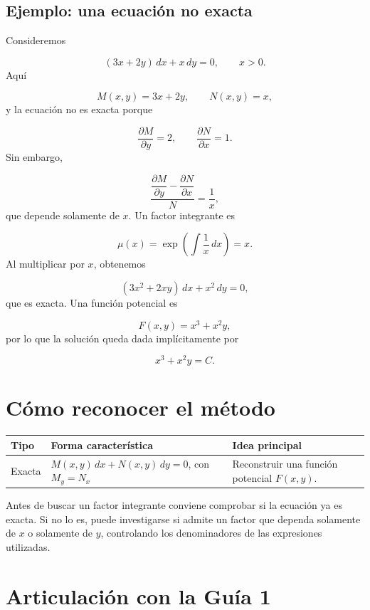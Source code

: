 \documentclass[12pt,a4paper]{article}
\begin{document}
	\subsection{Ejemplo: una ecuación no exacta}

	Consideremos

	\[
	(3x+2y)\,dx+x\,dy=0,
	\qquad x>0.
	\]
	Aquí

	\[
	M(x,y)=3x+2y,
	\qquad
	N(x,y)=x,
	\]
	y la ecuación no es exacta porque

	\[
	\frac{\partial M}{\partial y}=2,
	\qquad
	\frac{\partial N}{\partial x}=1.
	\]
	Sin embargo,

	\[
	\frac{\dfrac{\partial M}{\partial y}-\dfrac{\partial N}{\partial x}}{N}
	=
	\frac{1}{x},
	\]
	que depende solamente de \(x\). Un factor integrante es

	\[
	\mu(x)=\exp\left(\int\frac{1}{x}\,dx\right)=x.
	\]
	Al multiplicar por \(x\), obtenemos

	\[
	(3x^2+2xy)\,dx+x^2\,dy=0,
	\]
	que es exacta. Una función potencial es

	\[
	F(x,y)=x^3+x^2y,
	\]
	por lo que la solución queda dada implícitamente por

	\[
	\boxed{x^3+x^2y=C.}
	\]


	\clearpage
	\section{Cómo reconocer el método}

	\begin{center}
	\begin{tabularx}{\textwidth}{@{}
		>{\raggedright\arraybackslash}p{}
		>{\raggedright\arraybackslash}X
		>{\raggedright\arraybackslash}X@{}}
		\toprule
		\textbf{Tipo} & \textbf{Forma característica} & \textbf{Idea principal} \\
		\midrule
		Exacta &
		\(M(x,y)\,dx+N(x,y)\,dy=0\), con \(M_y=N_x\) &
		Reconstruir una función potencial \(F(x,y)\). \\
		\bottomrule
	\end{tabularx}
	\end{center}

	Antes de buscar un factor integrante conviene comprobar si la ecuación ya es exacta. Si no lo es, puede investigarse si admite un factor que dependa solamente de \(x\) o solamente de \(y\), controlando los denominadores de las expresiones utilizadas.

	\section*{Articulación con la Guía 1}
\end{document}
